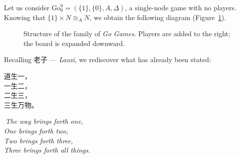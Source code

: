 Let us consider $\mathrm{Go}^0_0 = (\{1\}, \{0\}, A, \Delta)$, a single-node game with no players. Knowing that $\{1\} \times N \cong_A N$, we obtain the following diagram (Figure~\ref{fig:familia-go}).
\begin{figure}[H]
	\centering
	\caption{Structure of the family of \textit{Go Games}. Players are added to the right; the board is expanded downward.}
	\label{fig:familia-go}
\end{figure}
Recalling 老子 — \textit{Laozi}, we rediscover what has already been stated:\\
\noindent
\begin{minipage}[t]{0.35\textwidth}
	\begin{flushright}
		{\large
			\vspace{1pt}
			道生一，\\
			一生二，\\
			二生三，\\
			三生万物。
		}
	\end{flushright}
\end{minipage}%
\hfill
\vrule
\hfill
\begin{minipage}[t]{0.48\textwidth}
	\raggedright
	\vspace{1pt}
	\emph{
		$\ \!\!\!$The way brings forth one, \\
		One brings forth two, \\
		Two brings forth three, \\
		Three brings forth all things.}
\end{minipage}

